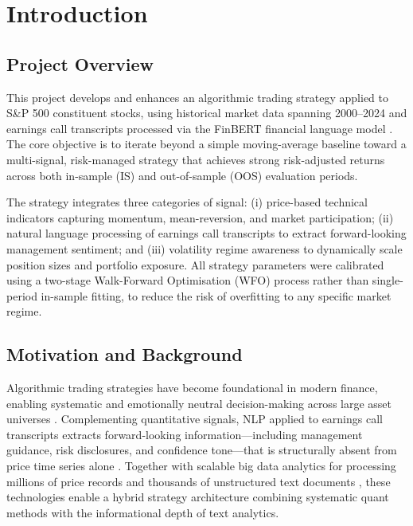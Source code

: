 \documentclass[11pt,twoside,a4paper]{article}
\begin{document}



\section{Introduction}

\subsection{Project Overview}

This project develops and enhances an algorithmic trading strategy applied to S\&P 500 constituent stocks, using historical market data spanning 2000--2024 and earnings call transcripts processed via the FinBERT financial language model \citep{Araci2019}. The core objective is to iterate beyond a simple moving-average baseline toward a multi-signal, risk-managed strategy that achieves strong risk-adjusted returns across both in-sample (IS) and out-of-sample (OOS) evaluation periods.

The strategy integrates three categories of signal: (i) price-based technical indicators capturing momentum, mean-reversion, and market participation; (ii) natural language processing of earnings call transcripts to extract forward-looking management sentiment; and (iii) volatility regime awareness to dynamically scale position sizes and portfolio exposure. All strategy parameters were calibrated using a two-stage Walk-Forward Optimisation (WFO) process rather than single-period in-sample fitting, to reduce the risk of overfitting to any specific market regime.

\subsection{Motivation and Background}

Algorithmic trading strategies have become foundational in modern finance, enabling systematic and emotionally neutral decision-making across large asset universes \citep{Lopez2018}. Complementing quantitative signals, NLP applied to earnings call transcripts extracts forward-looking information---including management guidance, risk disclosures, and confidence tone---that is structurally absent from price time series alone \citep{Huang2014}. Together with scalable big data analytics for processing millions of price records and thousands of unstructured text documents \citep{Manyika2011}, these technologies enable a hybrid strategy architecture combining systematic quant methods with the informational depth of text analytics.
\end{document}
